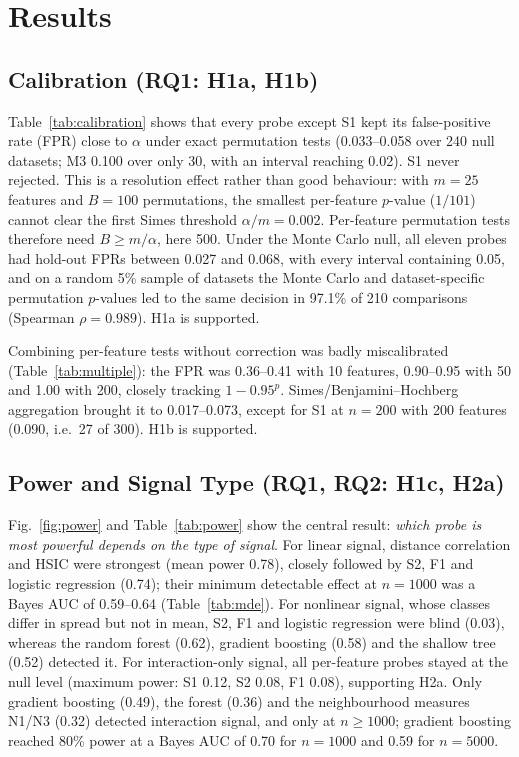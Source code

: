 \section{Results}
\label{sec:results}

\subsection{Calibration (RQ1: H1a, H1b)}

Table~\ref{tab:calibration} shows that every probe except S1 kept its false-positive rate (FPR) close to $\alpha$ under exact permutation tests (0.033--0.058 over 240 null datasets; M3 0.100 over only 30, with an interval reaching 0.02). S1 never rejected. This is a resolution effect rather than good behaviour: with $m=25$ features and $B=100$ permutations, the smallest per-feature $p$-value ($1/101$) cannot clear the first Simes threshold $\alpha/m=0.002$. Per-feature permutation tests therefore need $B\ge m/\alpha$, here 500. Under the Monte Carlo null, all eleven probes had hold-out FPRs between 0.027 and 0.068, with every interval containing 0.05, and on a random 5\% sample of datasets the Monte Carlo and dataset-specific permutation $p$-values led to the same decision in 97.1\% of 210 comparisons (Spearman $\rho=0.989$). H1a is supported.



Combining per-feature tests without correction was badly miscalibrated (Table~\ref{tab:multiple}): the FPR was 0.36--0.41 with 10 features, 0.90--0.95 with 50 and 1.00 with 200, closely tracking $1-0.95^p$. Simes/Benjamini--Hochberg aggregation brought it to 0.017--0.073, except for S1 at $n=200$ with 200 features (0.090, i.e.\ 27 of 300). H1b is supported.



\subsection{Power and Signal Type (RQ1, RQ2: H1c, H2a)}

Fig.~\ref{fig:power} and Table~\ref{tab:power} show the central result: \emph{which probe is most powerful depends on the type of signal}. For linear signal, distance correlation and HSIC were strongest (mean power 0.78), closely followed by S2, F1 and logistic regression (0.74); their minimum detectable effect at $n=1000$ was a Bayes AUC of 0.59--0.64 (Table~\ref{tab:mde}). For nonlinear signal, whose classes differ in spread but not in mean, S2, F1 and logistic regression were blind (0.03), whereas the random forest (0.62), gradient boosting (0.58) and the shallow tree (0.52) detected it. For interaction-only signal, all per-feature probes stayed at the null level (maximum power: S1 0.12, S2 0.08, F1 0.08), supporting H2a. Only gradient boosting (0.49), the forest (0.36) and the neighbourhood measures N1/N3 (0.32) detected interaction signal, and only at $n\ge1000$; gradient boosting reached 80\% power at a Bayes AUC of 0.70 for $n=1000$ and 0.59 for $n=5000$.

